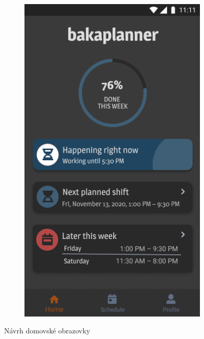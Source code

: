 \documentclass[twoside]{ctuthesis}
\begin{document}
\begin{figure}[h]
\begin{subfigure}[h!]{.5\textwidth}
		\includegraphics[width=.9\linewidth]{img/v1-main-home-night.png}
		\label{fig:main-home-dark}
	\end{subfigure}
	\caption{Návrh domovské obrazovky}
\end{figure}
\end{document}
